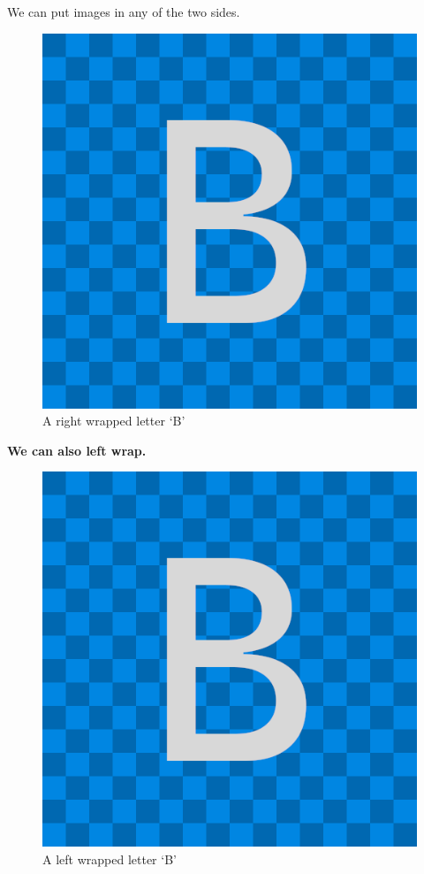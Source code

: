 \documentclass[a4paper, 11pt]{article}
\begin{document}
We can put images in any of the two sides. \kant[1]
\begin{figure}
    \centering
    \includegraphics[width=0.9\linewidth]{ImageB}
    \caption{A right wrapped letter `B'}
    \label{fig:bwrapped}
\end{figure}

\textbf{We can also left wrap.} \kant[3]

\begin{figure}
    \centering
    \includegraphics[width=0.9\linewidth]{ImageB}
    \caption{A left wrapped letter `B'}
    \label{fig:bwrappedl}
\end{figure}
\end{document}
